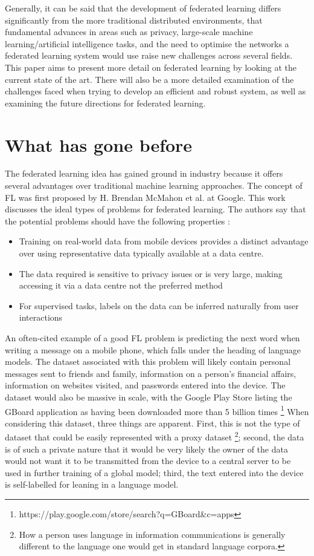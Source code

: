 \documentclass[conference]{IEEEtran}
\begin{document}
Generally, it can be said that the development of federated learning differs significantly from the more traditional distributed environments, that fundamental advances in areas such as privacy, large-scale machine learning/artificial intelligence tasks, and the need to optimise the networks a federated learning system would use raise new challenges across several fields. \\
This paper aims to present more detail on federated learning by looking at the current state of the art. There will also be a more detailed examination of the challenges faced when trying to develop an efficient and robust system, as well as examining the future directions for federated learning. 

\section{What has gone before}
The federated learning idea has gained ground in industry because it offers several advantages over traditional machine learning approaches. The concept of FL was first proposed by H. Brendan McMahon et al. at Google. This work discusses the ideal types of problems for federated learning. The authors say that the potential problems should have the following properties \cite{b4}:
\begin{itemize}
    \item Training on real-world data from mobile devices provides a distinct advantage over using representative data typically available at a data centre.
    \item The data required is sensitive to privacy issues or is very large, making accessing it via a data centre not the preferred method
    \item For supervised tasks, labels on the data can be inferred naturally from user interactions
\end{itemize}

An often-cited example of a good FL problem is predicting the next word when writing a message on a mobile phone, which falls under the heading of language models. The dataset associated with this problem will likely contain personal messages sent to friends and family, information on a person's financial affairs, information on websites visited, and passwords entered into the device. The dataset would also be massive in scale, with the Google Play Store listing the GBoard application as having been downloaded more than 5 billion times \footnote{https://play.google.com/store/search?q=GBoard\&c=apps} When considering this dataset, three things are apparent. First, this is not the type of dataset that could be easily represented with a proxy dataset \footnote{How a person uses language in information communications is generally different to the language one would get in standard language corpora.}; second, the data is of such a private nature that it would be very likely the owner of the data would not want it to be transmitted from the device to a central server to be used in further training of a global model; third, the text entered into the device is self-labelled for leaning in a language model.
\end{document}
